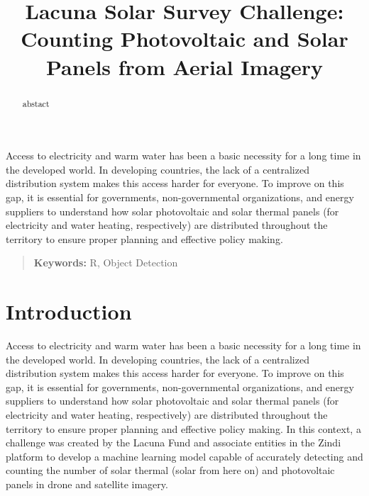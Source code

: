 \documentclass[conference]{IEEEtran}
\begin{document}
\title{Lacuna Solar Survey Challenge: Counting Photovoltaic and Solar Panels from Aerial Imagery}

\author{
\and
{}
}

\maketitle
\thispagestyle{plain}

\begin{abstract}
abstact
\end{abstract}
Access to electricity and warm water has been a basic necessity for a long time in the developed world. In developing countries, the lack of a centralized distribution system makes this access harder for everyone. To improve on this gap, it is essential for governments, non-governmental organizations, and energy suppliers to understand how solar photovoltaic and solar thermal panels (for electricity and water heating, respectively) are distributed throughout the territory to ensure proper planning and effective policy making.
\begin{quote}
\small
\noindent
\textbf{Keywords:} R, Object Detection
\end{quote}

\IEEEpeerreviewmaketitle


\section{Introduction}

Access to electricity and warm water has been a basic necessity for a long time in the developed world. In developing countries, the lack of a centralized distribution system makes this access harder for everyone. To improve on this gap, it is essential for governments, non-governmental organizations, and energy suppliers to understand how solar photovoltaic and solar thermal panels (for electricity and water heating, respectively) are distributed throughout the territory to ensure proper planning and effective policy making. In this context, a challenge was created by the Lacuna Fund and associate entities in the Zindi platform to develop a machine learning model capable of accurately detecting and counting the number of solar thermal (solar from here on) and photovoltaic panels in drone and satellite imagery.
\end{document}
